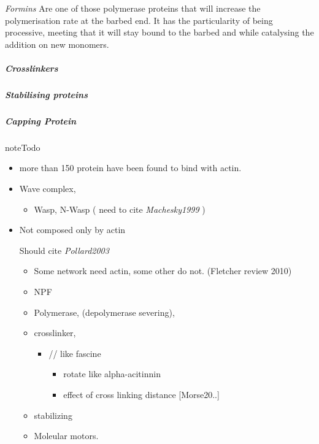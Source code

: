 \documentclass[A4paperpaper,11pt,english]{sphinxmanual}
\begin{document}
\emph{Formins} Are one of those polymerase proteins that will
increase the polymerisation rate at the barbed end. It has the particularity of
being processive, meeting that it will stay bound to the barbed and while
catalysing the addition on new monomers.


\subparagraph{Crosslinkers}
\label{parts/part1:crosslinkers}

\subparagraph{Stabilising proteins}
\label{parts/part1:stabilising-proteins}

\subparagraph{Capping Protein}
\label{parts/part1:capping-protein}
\begin{notice}{note}{Todo}
\begin{itemize}
\item {} 
more than 150 protein have been found to bind with actin.

\item {} 
Wave complex,
\begin{itemize}
\item {} 
Wasp, N-Wasp ( need to cite \emph{Machesky1999} )

\end{itemize}

\item {} 
Not composed only by actin

Should cite \emph{Pollard2003}
\begin{itemize}
\item {} 
Some network need actin, some other do not. (Fletcher review 2010)

\item {} 
NPF

\item {} 
Polymerase, (depolymerase severing),

\item {} 
crosslinker,
\begin{itemize}
\item {} 
// like fascine
\begin{itemize}
\item {} 
rotate like alpha-acitinnin

\item {} 
effect of cross linking distance {[}Morse20..{]}

\end{itemize}

\end{itemize}

\item {} 
stabilizing

\item {} 
Moleular motors.


\end{itemize}
\end{itemize}
\end{notice}
\end{document}
